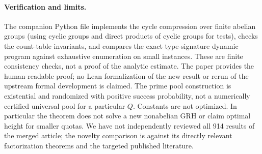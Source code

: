 \documentclass[11pt]{article}
\theoremstyle{remark}\newtheorem{remark}[theorem]{Remark}
\begin{document}
\paragraph{Verification and limits.} The companion Python file implements the cycle compression over finite abelian groups (using cyclic groups and direct products of cyclic groups for tests), checks the count-table invariants, and compares the exact type-signature dynamic program against exhaustive enumeration on small instances. These are finite consistency checks, not a proof of the analytic estimate. The paper provides the human-readable proof; no Lean formalization of the new result or rerun of the upstream formal development is claimed. The prime pool construction is existential and randomized with positive success probability, not a numerically certified universal pool for a particular $Q$. Constants are not optimized. In particular the theorem does not solve a new nonabelian GRH or claim optimal height for smaller quotas. We have not independently reviewed all 914 results of the merged article; the novelty comparison is against its directly relevant factorization theorems and the targeted published literature.
\end{document}
